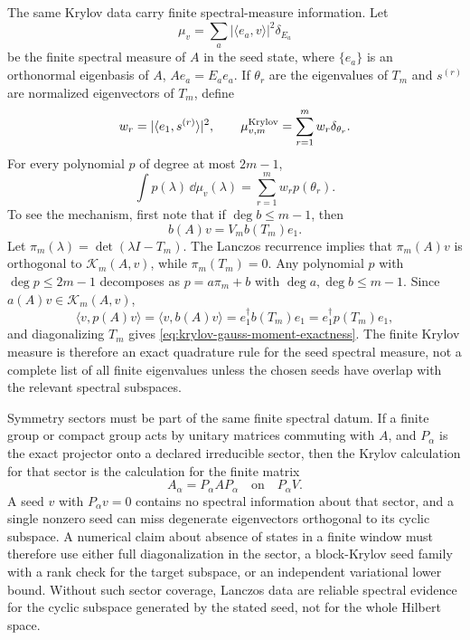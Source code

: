 The same Krylov data carry finite spectral-measure information.  Let
\[
  \mu_v=\sum_a |\langle e_a,v\rangle|^2\delta_{E_a}
\]
be the finite spectral measure of \(A\) in the seed state, where
\(\{e_a\}\) is an orthonormal eigenbasis of \(A\), \(Ae_a=E_a e_a\).  If
\(\theta_r\) are the eigenvalues of \(T_m\) and \(s^{(r)}\) are normalized
eigenvectors of \(T_m\), define
\[
  w_r=|\langle e_1,s^{(r)}\rangle|^2 ,
  \qquad
  \mu_{v,m}^{\rm Krylov}=\sum_{r=1}^{m}w_r\delta_{\theta_r}.
\]
For every polynomial \(p\) of degree at most \(2m-1\),
\begin{equation}
  \int p(\lambda)\,\dd\mu_v(\lambda)
  =
  \sum_{r=1}^{m} w_r p(\theta_r).
  \label{eq:krylov-gauss-moment-exactness}
\end{equation}
To see the mechanism, first note that if \(\deg b\leq m-1\), then
\[
  b(A)v=V_m b(T_m)e_1 .
\]
Let \(\pi_m(\lambda)=\det(\lambda I-T_m)\).  The Lanczos recurrence implies
that \(\pi_m(A)v\) is orthogonal to \(\mathcal K_m(A,v)\), while
\(\pi_m(T_m)=0\).  Any polynomial \(p\) with \(\deg p\leq2m-1\) decomposes
as \(p=a\pi_m+b\) with \(\deg a,\deg b\leq m-1\).  Since
\(a(A)v\in\mathcal K_m(A,v)\),
\[
  \langle v,p(A)v\rangle
  =
  \langle v,b(A)v\rangle
  =
  e_1^\dagger b(T_m)e_1
  =
  e_1^\dagger p(T_m)e_1,
\]
and diagonalizing \(T_m\) gives
\eqref{eq:krylov-gauss-moment-exactness}.  The finite Krylov measure is
therefore an exact quadrature rule for the seed spectral measure, not a
complete list of all finite eigenvalues unless the chosen seeds have overlap
with the relevant spectral subspaces.

Symmetry sectors must be part of the same finite spectral datum.  If a finite group or
compact group acts by unitary matrices commuting with \(A\), and \(P_\alpha\)
is the exact projector onto a declared irreducible sector, then the Krylov
calculation for that sector is the calculation for the finite matrix
\[
  A_\alpha=P_\alpha A P_\alpha
  \quad\text{on}\quad
  P_\alpha V .
\]
A seed \(v\) with \(P_\alpha v=0\) contains no spectral information about
that sector, and a single nonzero seed can miss degenerate eigenvectors
orthogonal to its cyclic subspace.  A numerical claim about absence of states
in a finite window must therefore use either full diagonalization in the
sector, a block-Krylov seed family with a rank check for the target
subspace, or an independent variational lower bound.  Without such sector
coverage, Lanczos data are reliable spectral evidence for the cyclic
subspace generated by the stated seed, not for the whole Hilbert space.

